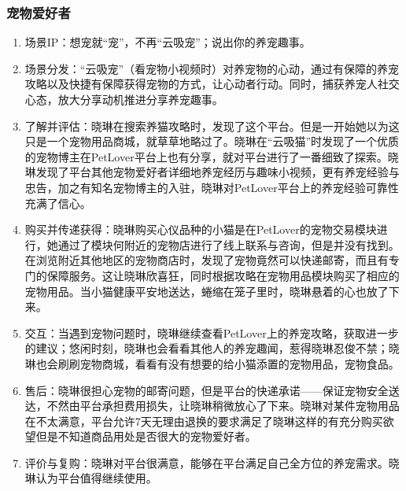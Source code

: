 \documentclass[a4paper]{ctexart}
\begin{document}
\subsubsection{宠物爱好者}
\begin{enumerate}[label=\alph*.]
  \item 场景IP：想宠就“宠”，不再“云吸宠”；说出你的养宠趣事。
  \item 场景分发：“云吸宠”（看宠物小视频时）对养宠物的心动，通过有保障的养宠攻略以及快捷有保障获得宠物的方式，让心动者行动。同时，捕获养宠人社交心态，放大分享动机推进分享养宠趣事。
  \item 了解并评估：晓琳在搜索养猫攻略时，发现了这个平台。但是一开始她以为这只是一个宠物用品商城，就草草地略过了。晓琳在“云吸猫”时发现了一个优质的宠物博主在PetLover平台上也有分享，就对平台进行了一番细致了探索。晓琳发现了平台其他宠物爱好者详细地养宠经历与趣味小视频，更有养宠经验与忠告，加之有知名宠物博主的入驻，晓琳对PetLover平台上的养宠经验可靠性充满了信心。
  \item 购买并传递获得：晓琳购买心仪品种的小猫是在PetLover的宠物交易模块进行，她通过了模块何附近的宠物店进行了线上联系与咨询，但是并没有找到。在浏览附近其他地区的宠物商店时，发现了宠物竟然可以快递邮寄，而且有专门的保障服务。这让晓琳欣喜狂，同时根据攻略在宠物用品模块购买了相应的宠物用品。当小猫健康平安地送达，蜷缩在笼子里时，晓琳悬着的心也放了下来。
  \item 交互：当遇到宠物问题时，晓琳继续查看PetLover上的养宠攻略，获取进一步的建议；悠闲时刻，晓琳也会看看其他人的养宠趣闻，惹得晓琳忍俊不禁；晓琳也会刷刷宠物商城，看看有没有想要的给小猫添置的宠物用品，宠物食品。
  \item 售后：晓琳很担心宠物的邮寄问题，但是平台的快递承诺——保证宠物安全送达，不然由平台承担费用损失，让晓琳稍微放心了下来。晓琳对某件宠物用品在不太满意，平台允许7天无理由退换的要求满足了晓琳这样的有充分购买欲望但是不知道商品用处是否很大的宠物爱好者。
  \item 评价与复购：晓琳对平台很满意，能够在平台满足自己全方位的养宠需求。晓琳认为平台值得继续使用。
\end{enumerate}
\end{document}

